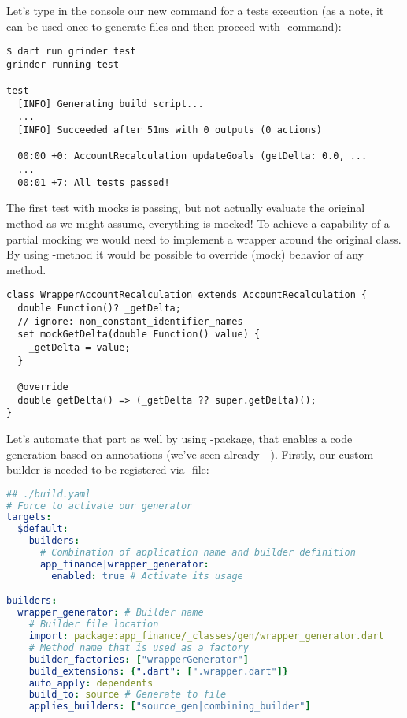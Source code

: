 \noindent Let's type in the console our new command for a tests execution (as a note, it can be used once to generate 
files and then proceed with -command):

\begin{lstlisting}[language=terminal]
$ dart run grinder test
grinder running test

test
  [INFO] Generating build script...
  ...
  [INFO] Succeeded after 51ms with 0 outputs (0 actions)

  00:00 +0: AccountRecalculation updateGoals (getDelta: 0.0, ...
  ...
  00:01 +7: All tests passed!
\end{lstlisting}

\noindent The first test with mocks is passing, but not actually evaluate the original method as we might assume, 
everything is mocked! To achieve a capability of a partial mocking we would need to implement a wrapper around the 
original class. By using -method it would be possible to override (mock) behavior of any method. 

\begin{lstlisting}
class WrapperAccountRecalculation extends AccountRecalculation {
  double Function()? _getDelta;
  // ignore: non_constant_identifier_names
  set mockGetDelta(double Function() value) {
    _getDelta = value;
  }

  @override
  double getDelta() => (_getDelta ?? super.getDelta)();
}
\end{lstlisting}

\noindent Let's automate that part as well by using -package, that enables a code generation based on 
annotations (we've seen already - ). Firstly, our custom builder is needed to be registered via 
-file:

\begin{lstlisting}[language=yaml]
## ./build.yaml
# Force to activate our generator
targets:
  $default:
    builders: 
      # Combination of application name and builder definition
      app_finance|wrapper_generator:
        enabled: true # Activate its usage

builders:
  wrapper_generator: # Builder name
    # Builder file location
    import: package:app_finance/_classes/gen/wrapper_generator.dart
    # Method name that is used as a factory
    builder_factories: ["wrapperGenerator"]
    build_extensions: {".dart": [".wrapper.dart"]}
    auto_apply: dependents
    build_to: source # Generate to file
    applies_builders: ["source_gen|combining_builder"]
\end{lstlisting}

